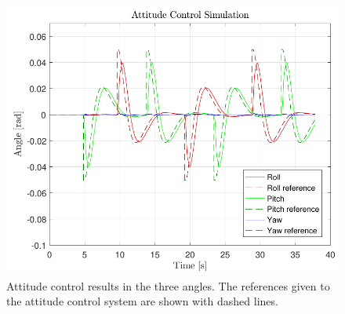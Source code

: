 \begin{figure}[H]
	\centering
	\includegraphics[scale=0.55]{figures/AttitudeControl}
	\caption{Attitude control results in the three angles. The references given to the attitude control system are shown with dashed lines.}
	\label{AttitudeControl}
\end{figure}


